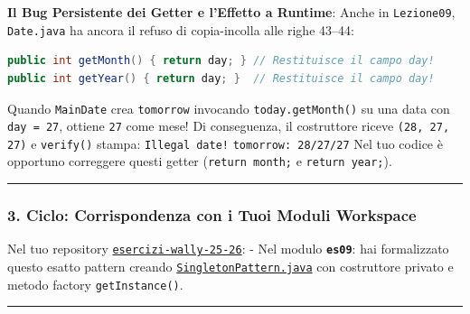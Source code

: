 \documentclass[11pt,a4paper]{article}
\newcommand{\passthrough}[1]{#1}
\begin{document}
\begin{studywarning} \textbf{Il Bug Persistente dei Getter e l'Effetto a
Runtime}: Anche in \passthrough{\lstinline!Lezione09!},
\passthrough{\lstinline!Date.java!} ha ancora il refuso di copia-incolla
alle righe 43--44:

\begin{lstlisting}[language=Java]
public int getMonth() { return day; } // Restituisce il campo day!
public int getYear() { return day; }  // Restituisce il campo day!
\end{lstlisting}

Quando \passthrough{\lstinline!MainDate!} crea
\passthrough{\lstinline!tomorrow!} invocando
\passthrough{\lstinline!today.getMonth()!} su una data con
\passthrough{\lstinline!day = 27!}, ottiene \passthrough{\lstinline!27!}
come mese! Di conseguenza, il costruttore riceve
\passthrough{\lstinline!(28, 27, 27)!} e
\passthrough{\lstinline!verify()!} stampa:
\passthrough{\lstinline"Illegal date!"}
\passthrough{\lstinline!tomorrow: 28/27/27!} Nel tuo codice è opportuno
correggere questi getter (\passthrough{\lstinline!return month;!} e
\passthrough{\lstinline!return year;!}).
\end{studywarning}

\begin{center}\rule{0.5\linewidth}{0.5pt}\end{center}

\subsubsection{3. Ciclo: Corrispondenza con i Tuoi Moduli
Workspace}\label{ciclo-corrispondenza-con-i-tuoi-moduli-workspace}

Nel tuo repository
\href{file:///home/wally/Documenti/GitHub/Programmazione-II/25-26/esercizi-wally-25-26}{\passthrough{\lstinline!esercizi-wally-25-26!}}:
- Nel modulo \textbf{\passthrough{\lstinline!es09!}}: hai formalizzato
questo esatto pattern creando
\href{file:///home/wally/Documenti/GitHub/Programmazione-II/25-26/esercizi-wally-25-26/es09/src/main/java/es09/SingletonPattern.java}{\passthrough{\lstinline!SingletonPattern.java!}}
con costruttore privato e metodo factory
\passthrough{\lstinline!getInstance()!}.

\begin{center}\rule{0.5\linewidth}{0.5pt}\end{center}
\end{document}
